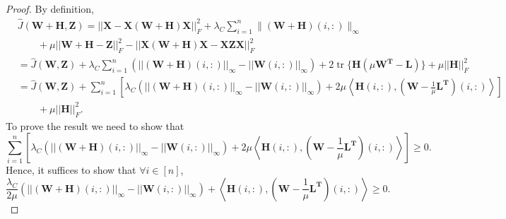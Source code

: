 \documentclass[10pt,a4paper]{amsart}
\DeclareMathOperator{\tr}{tr}
\begin{document}
\begin{proof}
By definition, 
\begin{equation*}
\begin{split}
& \widehat{J}(\mathbf{W+H}, \mathbf{Z})  = ||\mathbf{X-X(W+H)X}||_F^2 + \lambda_C \sum_{i=1}^n \| (\mathbf{W+H})(i,:) \|_{\infty} \\ 
& \quad \quad + \mu ||\mathbf{W+H}-\mathbf{Z}||_F^2 - ||\mathbf{X(W+H)X}-\mathbf{XZX}||_F^2 \\
& = \widehat{J}(\mathbf{W}, \mathbf{Z}) + \lambda_C \sum_{i=1}^n \left(||(\mathbf{W+H})(i,:)||_\infty - ||\mathbf{W}(i,:)||_\infty \right)  + 2 \tr\{\mathbf{H}(\mu \mathbf{W^T - L})\} + \mu ||\mathbf{H}||_F^2 \\
& = \widehat{J}(\mathbf{W}, \mathbf{Z}) + \sum_{i=1}^n \left[ \lambda_C(||(\mathbf{W+H})(i,:)||_\infty - ||\mathbf{W}(i,:)||_\infty) + 2\mu \left\langle \mathbf{H}(i,:), (\mathbf{W} - \frac{1}{\mu}\mathbf{L^T})(i,:) \right\rangle \right] \\
& \quad \quad + \mu ||\mathbf{H}||_F^2. 
\end{split}
\end{equation*}
To prove the result we need to show that
\[
\sum_{i=1}^n \left[ \lambda_C(||(\mathbf{W+H})(i,:)||_\infty - ||\mathbf{W}(i,:)||_\infty) + 2\mu \left\langle \mathbf{H}(i,:), (\mathbf{W} - \frac{1}{\mu}\mathbf{L^T})(i,:) \right\rangle \right] \geq 0.
\]
Hence, it suffices to show that $\forall i \in [n]$,
\begin{equation}
\label{pf:F}
\frac{\lambda_C}{2\mu} (||(\mathbf{W+H})(i,:)||_\infty - ||\mathbf{W}(i,:)||_\infty) + \left\langle \mathbf{H}(i,:), (\mathbf{W} - \frac{1}{\mu}\mathbf{L^T})(i,:) \right\rangle \geq 0.
\end{equation}


\end{proof}
\end{document}

